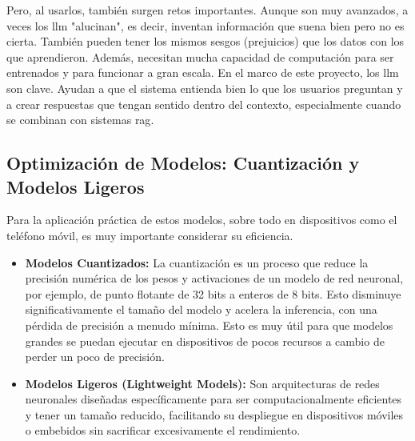 Pero, al usarlos, también surgen retos importantes. Aunque son muy avanzados, a veces los \gls{llm} "alucinan", es decir, inventan información que suena bien pero no es cierta. También pueden tener los mismos sesgos (prejuicios) que los datos con los que aprendieron. Además, necesitan mucha capacidad de computación para ser entrenados y para funcionar a gran escala. En el marco de este proyecto, los \gls{llm} son clave. Ayudan a que el sistema entienda bien lo que los usuarios preguntan y a crear respuestas que tengan sentido dentro del contexto, especialmente cuando se combinan con sistemas \gls{rag}.

\subsection{Optimización de Modelos: Cuantización y Modelos Ligeros}
Para la aplicación práctica de estos modelos, sobre todo en dispositivos como el teléfono móvil, es muy importante considerar su eficiencia.
\begin{itemize}
    \item \textbf{Modelos Cuantizados:} La cuantización es un proceso que reduce la precisión numérica de los pesos y activaciones de un modelo de red neuronal, por ejemplo, de punto flotante de 32 bits a enteros de 8 bits. Esto disminuye significativamente el tamaño del modelo y acelera la inferencia, con una pérdida de precisión a menudo mínima. Esto es muy útil para que modelos grandes se puedan ejecutar en dispositivos de pocos recursos a cambio de perder un poco de precisión.
    \item \textbf{Modelos Ligeros (Lightweight Models):} Son arquitecturas de redes neuronales diseñadas específicamente para ser computacionalmente eficientes y tener un tamaño reducido, facilitando su despliegue en dispositivos móviles o embebidos sin sacrificar excesivamente el rendimiento.
\end{itemize}


